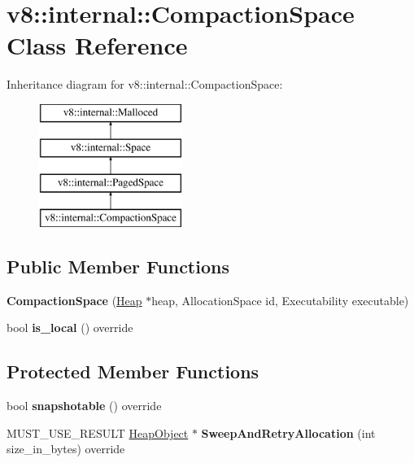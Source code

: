\hypertarget{classv8_1_1internal_1_1_compaction_space}{}\section{v8\+:\+:internal\+:\+:Compaction\+Space Class Reference}
\label{classv8_1_1internal_1_1_compaction_space}
Inheritance diagram for v8\+:\+:internal\+:\+:Compaction\+Space\+:\begin{figure}[H]
\begin{center}
\leavevmode
\includegraphics[height=4.000000cm]{classv8_1_1internal_1_1_compaction_space}
\end{center}
\end{figure}
\subsection*{Public Member Functions}
\begin{DoxyCompactItemize}
\item 
{\bfseries Compaction\+Space} (\hyperlink{classv8_1_1internal_1_1_heap}{Heap} $\ast$heap, Allocation\+Space id, Executability executable)\hypertarget{classv8_1_1internal_1_1_compaction_space_a34df47197780afe9d9c6f995d3ff77eb}{}\label{classv8_1_1internal_1_1_compaction_space_a34df47197780afe9d9c6f995d3ff77eb}

\item 
bool {\bfseries is\+\_\+local} () override\hypertarget{classv8_1_1internal_1_1_compaction_space_a8cc7c214df5d3c754bd2c80dcda73bef}{}\label{classv8_1_1internal_1_1_compaction_space_a8cc7c214df5d3c754bd2c80dcda73bef}

\end{DoxyCompactItemize}
\subsection*{Protected Member Functions}
\begin{DoxyCompactItemize}
\item 
bool {\bfseries snapshotable} () override\hypertarget{classv8_1_1internal_1_1_compaction_space_a2dab61a279898a30419bd2d8b709ce77}{}\label{classv8_1_1internal_1_1_compaction_space_a2dab61a279898a30419bd2d8b709ce77}

\item 
M\+U\+S\+T\+\_\+\+U\+S\+E\+\_\+\+R\+E\+S\+U\+LT \hyperlink{classv8_1_1internal_1_1_heap_object}{Heap\+Object} $\ast$ {\bfseries Sweep\+And\+Retry\+Allocation} (int size\+\_\+in\+\_\+bytes) override\hypertarget{classv8_1_1internal_1_1_compaction_space_aa57dc5708e8b2f482b4d826d24981fb6}{}\label{classv8_1_1internal_1_1_compaction_space_aa57dc5708e8b2f482b4d826d24981fb6}

\end{DoxyCompactItemize}
